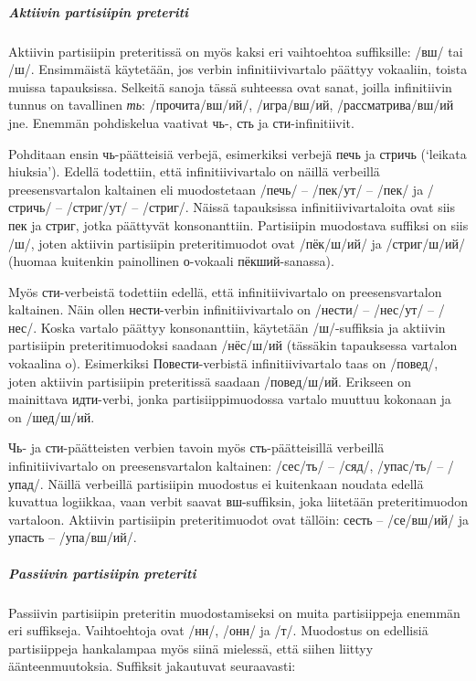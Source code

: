 \documentclass[]{scrreprt}
\begin{document}
\subparagraph{Aktiivin partisiipin
preteriti}\label{aktiivin-partisiipin-preteriti}

Aktiivin partisiipin preteritissä on myös kaksi eri vaihtoehtoa
suffiksille: /вш/ tai /ш/. Ensimmäistä käytetään, jos verbin
infinitiivivartalo päättyy vokaaliin, toista muissa tapauksissa.
Selkeitä sanoja tässä suhteessa ovat sanat, joilla infinitiivin tunnus
on tavallinen \emph{ть}: /прочита/вш/ий/, /игра/вш/ий,
/рассматрива/вш/ий jne. Enemmän pohdiskelua vaativat чь-, сть ja
сти-infinitiivit.

Pohditaan ensin чь-päätteisiä verbejä, esimerkiksi verbejä печь ja
стричь (`leikata hiuksia'). Edellä todettiin, että infinitiivivartalo on
näillä verbeillä preesensvartalon kaltainen eli muodostetaan /печь/ --
/пек/ут/ -- /пек/ ja /стричь/ -- /стриг/ут/ -- /стриг/. Näissä
tapauksissa infinitiivivartaloita ovat siis пек ja стриг, jotka
päättyvät konsonanttiin. Partisiipin muodostava suffiksi on siis /ш/,
joten aktiivin partisiipin preteritimuodot ovat /пёк/ш/ий/ ja
/стриг/ш/ий/ (huomaa kuitenkin painollinen о-vokaali пёкший-sanassa).

Myös сти-verbeistä todettiin edellä, että infinitiivivartalo on
preesensvartalon kaltainen. Näin ollen нести-verbin infinitiivivartalo
on /нести/ -- /нес/ут/ -- /нес/. Koska vartalo päättyy konsonanttiin,
käytetään /ш/-suffiksia ja aktiivin partisiipin preteritimuodoksi
saadaan /нёс/ш/ий (tässäkin tapauksessa vartalon vokaalina o).
Esimerkiksi Повести-verbistä infinitiivivartalo taas on /повед/, joten
aktiivin partisiipin preteritissä saadaan /повед/ш/ий. Erikseen on
mainittava идти-verbi, jonka partisiippimuodossa vartalo muuttuu
kokonaan ja on /шед/ш/ий.

Чь- ja сти-päätteisten verbien tavoin myös сть-päätteisillä verbeillä
infinitiivivartalo on preesensvartalon kaltainen: /сес/ть/ -- /сяд/,
/упас/ть/ -- /упад/. Näillä verbeillä partisiipin muodostus ei
kuitenkaan noudata edellä kuvattua logiikkaa, vaan verbit saavat
вш-suffiksin, joka liitetään preteritimuodon vartaloon. Aktiivin
partisiipin preteritimuodot ovat tällöin: сесть -- /се/вш/ий/ ja упасть
-- /упа/вш/ий/.

\subparagraph{Passiivin partisiipin
preteriti}\label{passiivin-partisiipin-preteriti}

Passiivin partisiipin preteritin muodostamiseksi on muita partisiippeja
enemmän eri suffikseja. Vaihtoehtoja ovat /нн/, /онн/ ja /т/. Muodostus
on edellisiä partisiippeja hankalampaa myös siinä mielessä, että siihen
liittyy äänteenmuutoksia. Suffiksit jakautuvat seuraavasti:
\end{document}
